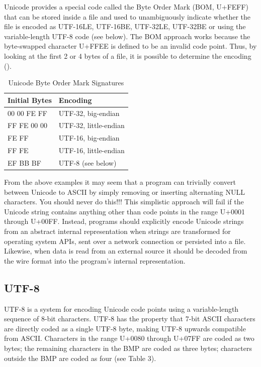 Unicode provides a special code called the Byte Order Mark (BOM, U+FEFF) that can be stored inside a file and used to unambiguously indicate whether the file is encoded as UTF-16LE, UTF-16BE, UTF-32LE, UTF-32BE or using the variable-length UTF-8 code (see below). The BOM approach works because the byte-swapped character U+FFEE is defined to be an invalid code point. Thus, by looking at the first 2 or 4 bytes of a  file, it is possible to determine the encoding ().

\begin{table}
\begin{tabular}{ll}
	Initial Bytes		&Encoding \\ 
\hline
	00 00 FE FF &       UTF-32, big-endian\\
	FF FE 00 00 &       UTF-32, little-endian\\
	FE FF       &       UTF-16, big-endian\\
	FF FE       &      UTF-16, little-endian\\
	EF BB BF    &      UTF-8 (see below)\\
\end{tabular}
\caption{Unicode Byte Order Mark Signatures}\label{unicode-bom}
\end{table}

From the above examples it may seem that a program can trivially convert between Unicode to ASCII by simply removing or inserting alternating NULL characters. You should never do this!!!  This simplistic approach will fail if the Unicode string contains anything other than code points in the range U+0001 through U+00FF. Instead, programs should explicitly encode Unicode strings from an abstract internal representation when strings are transformed for operating system APIs, sent over a network connection or persisted into a file. Likewise, when data is read from an external source it should be decoded from the wire format into the program's internal representation.


\subsection{UTF-8}

UTF-8 is a system for encoding Unicode code points using a
variable-length sequence of 8-bit characters. UTF-8 has the property
that 7-bit ASCII characters are directly coded as a single UTF-8 byte,
making UTF-8 upwards compatible from ASCII. Characters in the range
U+0080 through U+07FF are coded as two bytes; the remaining characters
in the BMP are coded as three bytes; characters outside the BMP are
coded as four (see Table 3). 

